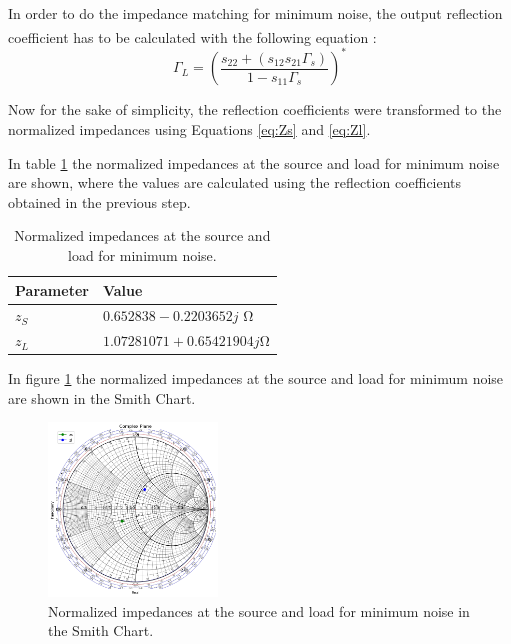 In order to do the impedance matching for minimum noise, the output reflection coefficient has to be calculated with the following equation \textsuperscript{\cite{Slides}}:
\begin{equation}
    \Gamma_{L} = (\frac{s_{22}+(s_{12}s_{21}\Gamma_s)}{1-s_{11}\Gamma_s})^*
    \label{eq:GammaL-noise}
\end{equation}

Now for the sake of simplicity, the reflection coefficients were transformed to the normalized impedances using Equations \ref{eq:Zs} and \ref{eq:Zl}.

In table \ref{tab: noise-impedances} the normalized impedances at the source and load for minimum noise are shown, where the values are calculated using the reflection coefficients obtained in the previous step.

\begin{table}[H]
    \centering
    \caption{Normalized impedances at the source and load for minimum noise.}
    \begin{tabularx}{\textwidth}{>{\centering\arraybackslash}X >{\centering\arraybackslash}X}
        \toprule
        \textbf{Parameter} & \textbf{Value} \\
        \midrule
        $z_{S}$     & $0.652838-0.2203652j$ \si{\ohm} \\
        \midrule
        $z_{L}$     & $1.07281071+0.65421904j$\si{\ohm}\\
        \bottomrule
    \end{tabularx}
    \label{tab: noise-impedances}
\end{table}

In figure \ref{fig:ZsZl-noise} the normalized impedances at the source and load for minimum noise are shown in the Smith Chart.

\begin{figure}[H]
    \centering
    \includegraphics[width=0.4\textwidth]{Images/ZsZl-noise-smithChart.png}
    \caption{Normalized impedances at the source and load for minimum noise in the Smith Chart.}
    \label{fig:ZsZl-noise}
\end{figure}

